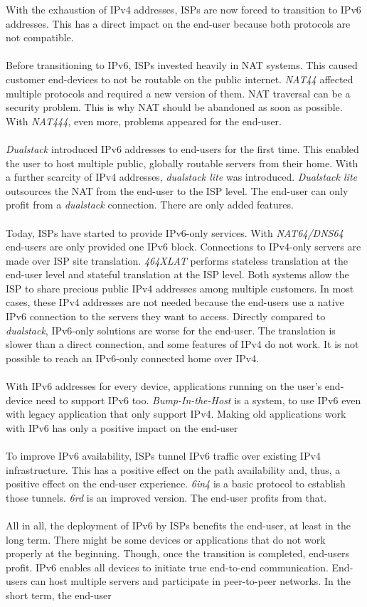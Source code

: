 \documentclass[format=sigconf, natbib=true, nonacm=true]{acmart}
\begin{document}
    With the exhaustion of IPv4 addresses, ISPs are now forced to transition to IPv6 addresses. This has a direct impact on the end-user because both protocols are not compatible.\\\\Before transitioning to IPv6, ISPs invested heavily in NAT systems. This caused customer end-devices to not be routable on the public internet. \textit{NAT44} affected multiple protocols and required a new version of them. NAT traversal can be a security problem. This is why NAT should be abandoned as soon as possible. With \textit{NAT444}, even more, problems appeared for the end-user.\\\\\textit{Dualstack} introduced IPv6 addresses to end-users for the first time. This enabled the user to host multiple public, globally routable servers from their home. With a further scarcity of IPv4 addresses, \textit{dualstack lite} was introduced. \textit{Dualstack lite} outsources the NAT from the end-user to the ISP level. The end-user can only profit from a \textit{dualstack} connection. There are only added features.\\\\Today, ISPs have started to provide IPv6-only services. With \textit{NAT64/DNS64} end-users are only provided one IPv6 block. Connections to IPv4-only servers are made over ISP site translation. \textit{464XLAT} performs stateless translation at the end-user level and stateful translation at the ISP level. Both systems allow the ISP to share precious public IPv4 addresses among multiple customers. In most cases, these IPv4 addresses are not needed because the end-users use a native IPv6 connection to the servers they want to access. Directly compared to \textit{dualstack}, IPv6-only solutions are worse for the end-user. The translation is slower than a direct connection, and some features of IPv4 do not work. It is not possible to reach an IPv6-only connected home over IPv4.\\\\With IPv6 addresses for every device, applications running on the user's end-device need to support IPv6 too. \textit{Bump-In-the-Host} is a system, to use IPv6 even with legacy application that only support IPv4. Making old applications work with IPv6 has only a positive impact on the end-user\\\\To improve IPv6 availability, ISPs tunnel IPv6 traffic over existing IPv4 infrastructure. This has a positive effect on the path availability and, thus, a positive effect on the end-user experience. \textit{6in4} is a basic protocol to establish those tunnels. \textit{6rd} is an improved version. The end-user profits from that.\\\\All in all, the deployment of IPv6 by ISPs benefits the end-user, at least in the long term. There might be some devices or applications that do not work properly at the beginning. Though, once the transition is completed, end-users profit. IPv6 enables all devices to initiate true end-to-end communication. End-users can host multiple servers and participate in peer-to-peer networks. In the short term, the end-user 
\end{document}
